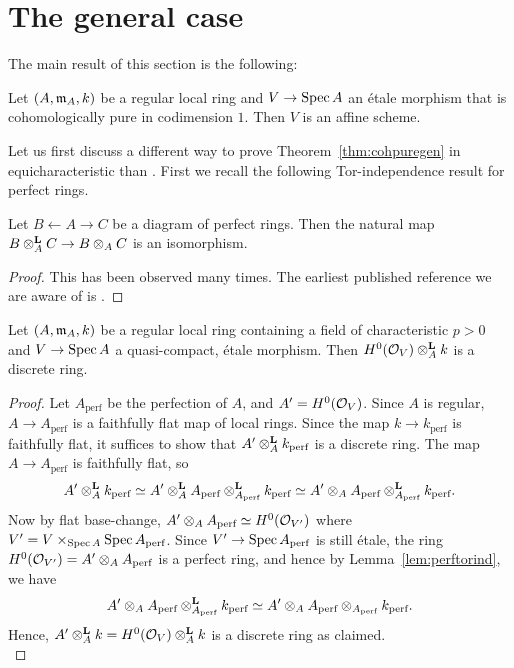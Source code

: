 \section{The general case}
The main result of this section is the following:
\begin{theorem}\label{thm:cohpuregen}
Let $(A,\ideal{m}_A,k)$ be a regular local ring and $V \to \spec{A}$ an \'{e}tale morphism that is cohomologically pure in codimension $1$. Then $V$ is an affine scheme.
\end{theorem}
Let us first discuss a different way to prove Theorem~\ref{thm:cohpuregen} in equicharacteristic than \cite[0ECD]{sp}. First we recall 
the following Tor-independence result for perfect rings.
\begin{lemma}\label{lem:perftorind}Let $B \leftarrow A \to C$ be a diagram of perfect rings. Then the natural map $B \otimesl_A C \to B \otimes_A C$ is an isomorphism.
\end{lemma}
\begin{proof}
This has been observed many times. The earliest published reference we are aware of is \cite[Lemma 3.16 or Proposition 11.6]{BhattScholzeProj}.
\end{proof}
\begin{theorem}\label{thm:cohpuregenp}
Let $(A,\ideal{m}_A,k)$ be a regular local ring containing a field of characteristic $p>0$ and $V \to \spec{A}$ a quasi-compact, \'{e}tale morphism. 
Then $H^0(\cal{O}_V) \otimesl_A k$ is a discrete ring.
\end{theorem}
\begin{proof}
Let $A_{\text{perf}}$ be the perfection of $A$, and $A'=H^0(\cal{O}_V)$. Since $A$ is regular, $A \to A_{\text{perf}}$ is a faithfully flat map of local rings.
Since the map $k \to k_{\text{perf}}$ is faithfully flat, it suffices to show that $A' \otimesl_A k_{\text{perf}}$ is a discrete ring.
The map $A \to A_{\text{perf}}$ is faithfully flat, so 
\[A' \otimesl_A k_{\text{perf}} \simeq A' \otimesl_A A_{\text{perf}} \otimesl_{A_{\text{perf}}} k_{\text{perf}} \simeq A' \otimes_A A_{\text{perf}} \otimesl_{A_{\text{perf}}} k_{\text{perf}}.\]
Now by flat base-change, $A' \otimes_A A_{\text{perf}} \simeq H^0(\cal{O}_{V'})$ where $V' = V \times_{\spec{A}} \spec{A_{\text{perf}}}$.
Since $V' \to \spec{A_{\text{perf}}}$ is still \'{e}tale, the ring $H^0(\cal{O}_{V'}) = A' \otimes_A A_{\text{perf}}$ is a perfect ring, and hence by Lemma~\ref{lem:perftorind}, we have
\[A' \otimes_A A_{\text{perf}} \otimesl_{A_{\text{perf}}} k_{\text{perf}} \simeq A' \otimes_A A_{\text{perf}} \otimes_{A_{\text{perf}}} k_{\text{perf}} .\]
Hence, $A' \otimesl_A k = H^0(\cal{O}_V) \otimesl_A k$ is a discrete ring as claimed.\\
\end{proof}
